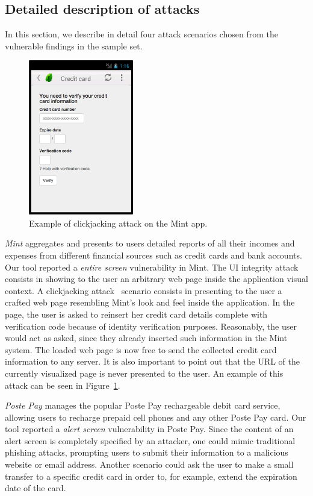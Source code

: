 \subsection{Detailed description of attacks}
\label{sec:remarkableResults}

In this section, we describe in detail four attack scenarios chosen from the vulnerable findings in the sample set. 

\begin{figure}[tb]
  \centering
    \includegraphics[width=1.8in]{./images/mint-example.png}
  \caption{Example of clickjacking attack on the Mint app.}
  \label{fig:mint}
\end{figure}

\textit{Mint} aggregates and presents to users detailed reports of all their incomes and expenses from different financial sources such as credit cards and bank accounts.
Our tool reported a \emph{entire screen} vulnerability in  Mint.
The UI integrity attack consists in showing to the user an arbitrary web page
inside the application visual context.
A clickjacking attack~\cite{android-clickjacking} scenario consists in presenting to the user a crafted web page resembling Mint's look and feel inside the application.
In the page, the user is asked to reinsert her credit card details complete
with verification code because of identity verification purposes. Reasonably, the user would act as asked, since they already inserted such information in the Mint system.
The loaded web page is now free to send the collected credit card information to any server. It is also important to point out that the URL of the currently visualized page is never presented to the user. An example of this attack can be seen in Figure~\ref{fig:mint}.

\textit{Poste Pay} manages the popular Poste Pay rechargeable debit card service, allowing users to recharge prepaid cell phones and any other Poste Pay card.
Our tool reported a \emph{alert screen} vulnerability in Poste Pay.
Since the content of an alert screen is completely specified by an attacker,
one could mimic traditional phishing attacks, prompting users to submit their information to a malicious website or email address. Another scenario could ask the user to make a small transfer to a specific credit card in order to, for example, extend the expiration date of the card.


